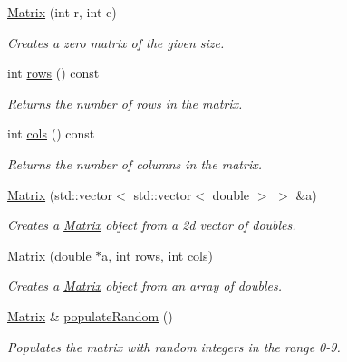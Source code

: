\begin{DoxyCompactItemize}
\item 
\hyperlink{class_matrix_a07a3cee5bc286ca27ceffe81ce5a2d01}{Matrix} (int r, int c)
\begin{DoxyCompactList}\small\item\em Creates a zero matrix of the given size. \item\end{DoxyCompactList}\item 
int \hyperlink{class_matrix_af238216c5c5ebf0a80e37bba96c99662}{rows} () const 
\begin{DoxyCompactList}\small\item\em Returns the number of rows in the matrix. \item\end{DoxyCompactList}\item 
int \hyperlink{class_matrix_ac9586a9d7bba127292ce84b1e8ee9cc1}{cols} () const 
\begin{DoxyCompactList}\small\item\em Returns the number of columns in the matrix. \item\end{DoxyCompactList}\item 
\hyperlink{class_matrix_a0db283ef4ea2660f8d0c1b58f9e74f49}{Matrix} (std::vector$<$ std::vector$<$ double $>$ $>$ \&a)
\begin{DoxyCompactList}\small\item\em Creates a \hyperlink{class_matrix}{Matrix} object from a 2d vector of doubles. \item\end{DoxyCompactList}\item 
\hyperlink{class_matrix_a3179cefb929e09cbdc95d143e1d9e3d2}{Matrix} (double $\ast$a, int rows, int cols)
\begin{DoxyCompactList}\small\item\em Creates a \hyperlink{class_matrix}{Matrix} object from an array of doubles. \item\end{DoxyCompactList}\item 
\hyperlink{class_matrix}{Matrix} \& \hyperlink{class_matrix_a375fc575a7e042d0eed3d76c7470e59f}{populateRandom} ()
\begin{DoxyCompactList}\small\item\em Populates the matrix with random integers in the range 0-\/9. \item\end{DoxyCompactList}\item 

\end{DoxyCompactItemize}
